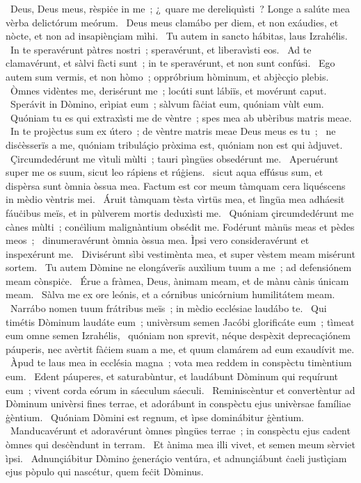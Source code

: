 \psalmChapterWithInscription{}
{ }
{%
~Deus, Deus meus, rèspiċe in me~; ¿~quare me dereliquìsti~? Longe a salúte mea vèrba delictórum meórum. 
~Deus meus clamábo per diem, et non exáudies, et nòcte, et non ad insapiènçiam mìhi. 
~Tu autem in sancto hábitas, laus Izrahélis. 
~In te speravérunt pàtres nostri~; speravérunt, et liberavìsti eos. 
~Ad te clamavérunt, et sàlvi fàcti sunt~; in te speravérunt, et non sunt confúsi. 
~Ego autem sum vermis, et non hòmo~; oppróbrium hòminum, et abjècçio plebis. 
~Òmnes vidèntes me, derisérunt me~; locúti sunt lábiïs, et movérunt caput. 
~Sperávit in Dòmino, erìpiat eum~; sàlvum fàċiat eum, quóniam vùlt eum. 
~Quóniam tu es qui extraxìsti me de vèntre~; spes mea ab ubèribus matris meae. 
~In te projèctus sum ex útero~; de vèntre matris meae Deus meus es tu~; 
~ne disċèsserïs a me, quóniam tribuláçio pròxima est, quóniam non est qui àdjuvet. 
~Çircumdedérunt me vìtuli mùlti~; tauri pìngües obsedérunt me. 
~Aperuérunt super me os suum, sicut leo rápiens et rúġiens. 
~sicut aqua effúsus sum, et dispèrsa sunt òmnia òssua mea. Factum est cor meum tàmquam cera liquéscens in mèdio vèntris mei. 
~Áruit tàmquam tèsta vìrtüs mea, et lìngüa mea adháesit fáuċibus meïs, et in pùlverem mortis deduxìsti me. 
~Quóniam çircumdedérunt me cànes mùlti~; conċìlium malignàntium obsédit me. Fodérunt mànüs meas et pèdes meos~; 
~dinumeravérunt òmnia òssua mea. Ìpsi vero consideravérunt et inspexérunt me. 
~Divisérunt sìbi vestimènta mea, et super vèstem meam misérunt sortem. 
~Tu autem Dòmine ne elongáverïs auxìlium tuum a me~; ad defensiónem meam cònspiċe. 
~Érue a fràmea, Deus, ànimam meam, et de mànu cànis únicam meam. 
~Sàlva me ex ore leónis, et a córnibus unicórnium humilitátem meam. 
~Narrábo nomen tuum frátribus meïs~; in mèdio ecclésiae laudábo te. 
~Qui timétis Dòminum laudáte eum~; univèrsum semen Jacóbi glorificáte eum~; tìmeat eum omne semen Izrahélis, 
~quóniam non sprevit, néque despèxit deprecaçiónem páuperis, nec avèrtit fàċiem suam a me, et quum clamárem ad eum exaudívit me. 
~Àpud te laus mea in ecclésia magna~; vota mea reddem in conspèctu timèntium eum. 
~Edent páuperes, et saturabùntur, et laudábunt Dòminum qui requírunt eum~; vivent corda eórum in sáeculum sáeculi. 
~Reminiscèntur et convertèntur ad Dòminum univèrsi fines terrae, et adorábunt in conspèctu ejus univèrsae famíliae ġèntium. 
~Quóniam Dòmini est regnum, et ìpse dominábitur ġèntium. 
~Manducavérunt et adoravérunt òmnes pìngües terrae~; in conspèctu ejus cadent òmnes qui desċèndunt in terram. 
~Et ànima mea illi vivet, et semen meum sèrviet ìpsi. 
~Adnunçiábitur Dòmino ġeneráçio ventúra, et adnunçiábunt ċaeli justìçiam ejus pòpulo qui nascétur, quem feċit Dòminus. 
}
